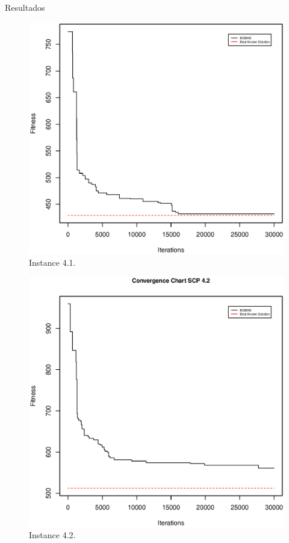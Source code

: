 Resultados


\begin{figure}[!htb]
\centering
\includegraphics[scale=.45]{Resultados/scp41.eps}
\caption{Instance 4.1.}
\label{fig:Instance.4.1}
\end{figure}


\begin{figure}[!htb]
\centering
\includegraphics[scale=.45]{Resultados/scp42.eps}
\caption{Instance 4.2.}
\label{fig:Instance.4.2}
\end{figure}

